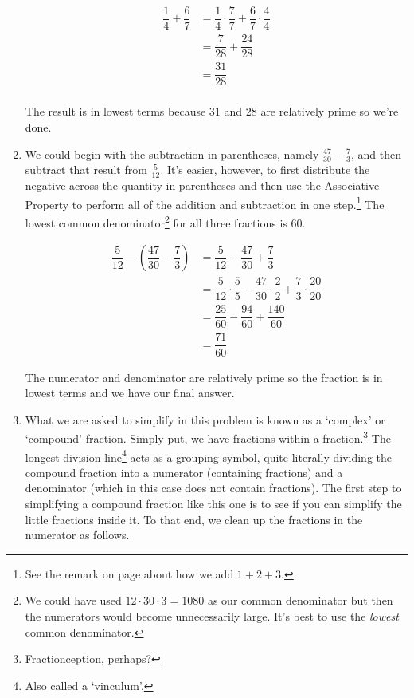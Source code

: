 \begin{ex}
\begin{enumerate}
\begin{align*}
\dfrac{1}{4} + \dfrac{6}{7} & = \dfrac{1}{4} \cdot \dfrac{7}{7} + \dfrac{6}{7} \cdot \dfrac{4}{4} \tag{Equivalent Fractions} \\
& = \dfrac{7}{28}  + \dfrac{24}{28} \tag{Multiplication of Fractions}\\
& = \dfrac{31}{28} \tag{Addition of Fractions} \\
\end{align*}

The result is in lowest terms because $31$ and $28$ are relatively prime so we're done.


\item  We could begin with the subtraction in parentheses, namely $\frac{47}{30} - \frac{7}{3}$, and then subtract that result from $\frac{5}{12}$.  It's easier, however, to first distribute the negative across the quantity in parentheses and then use the Associative Property to perform all of the addition and subtraction in one step.\footnote{See the remark on page \pageref{howtoaddonetwothree} about how we add $1 + 2 + 3$.}  The lowest common denominator\footnote{We could have used $12 \cdot 30 \cdot 3 = 1080$ as our common denominator but then the numerators would become unnecessarily large.  It's best to use the \emph{lowest} common denominator.} for all three fractions is $60$.

\begin{align*}
\dfrac{5}{12} - \left(\dfrac{47}{30} - \dfrac{7}{3}\right) & = \dfrac{5}{12} - \dfrac{47}{30} + \dfrac{7}{3} \tag{Distribute the Negative}\\
& = \dfrac{5}{12} \cdot \dfrac{5}{5} - \dfrac{47}{30} \cdot \dfrac{2}{2} + \dfrac{7}{3} \cdot \dfrac{20}{20} \tag{Equivalent Fractions}\\
& = \dfrac{25}{60} - \dfrac{94}{60} + \dfrac{140}{60} \tag{Multiplication of Fractions} \\
& = \dfrac{71}{60} \tag{Addition and Subtraction of Fractions}
\end{align*}

The numerator and denominator are relatively prime so the fraction is in lowest terms and we have our final answer.


\item What we are asked to simplify in this problem is known as a  `complex' or `compound' fraction.  Simply put, we have fractions within a fraction.\footnote{Fractionception, perhaps?}  The longest division line\footnote{Also called a `vinculum'.} acts as a grouping symbol, quite literally dividing the compound fraction into a numerator (containing fractions) and a denominator (which in this case does not contain fractions).  The first step to simplifying a compound fraction like this one is to see if you can simplify the little fractions inside it.  To that end, we clean up the fractions in the numerator as follows.


\end{enumerate}
\end{ex}
